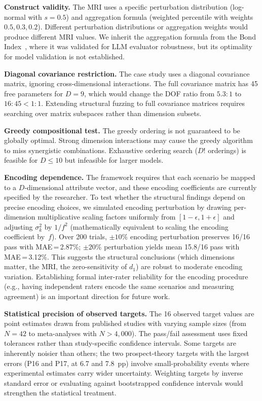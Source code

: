\documentclass[manuscript,review,anonymous]{acmart}
\begin{document}
\textbf{Construct validity.}
The MRI uses a specific perturbation distribution (log-normal with $s = 0.5$) and aggregation formula (weighted percentile with weights $0.5, 0.3, 0.2$).
Different perturbation distributions or aggregation weights would produce different MRI values.
We inherit the aggregation formula from the Bond Index~\cite{bond2026}, where it was validated for LLM evaluator robustness, but its optimality for model validation is not established.

\textbf{Diagonal covariance restriction.}
The case study uses a diagonal covariance matrix, ignoring cross-dimensional interactions.
The full covariance matrix has 45 free parameters for $D = 9$, which would change the DOF ratio from $5.3\!:\!1$ to $16\!:\!45 < 1\!:\!1$.
Extending structural fuzzing to full covariance matrices requires searching over matrix subspaces rather than dimension subsets.

\textbf{Greedy compositional test.}
The greedy ordering is not guaranteed to be globally optimal.
Strong dimension interactions may cause the greedy algorithm to miss synergistic combinations.
Exhaustive ordering search ($D!$ orderings) is feasible for $D \leq 10$ but infeasible for larger models.

\textbf{Encoding dependence.}
The framework requires that each scenario be mapped to a $D$-dimensional attribute vector, and these encoding coefficients are currently specified by the researcher.
To test whether the structural findings depend on precise encoding choices, we simulated encoding perturbation by drawing per-dimension multiplicative scaling factors uniformly from $[1{-}\epsilon, 1{+}\epsilon]$ and adjusting $\sigma_k^2$ by $1/f^2$ (mathematically equivalent to scaling the encoding coefficient by~$f$).
Over 200 trials, $\pm 10\%$ encoding perturbation preserves 16/16 pass with MAE\,=\,2.87\%; $\pm 20\%$ perturbation yields mean 15.8/16 pass with MAE\,=\,3.12\%.
This suggests the structural conclusions (which dimensions matter, the MRI, the zero-sensitivity of $d_1$) are robust to moderate encoding variation.
Establishing formal inter-rater reliability for the encoding procedure (e.g., having independent raters encode the same scenarios and measuring agreement) is an important direction for future work.

\textbf{Statistical precision of observed targets.}
The 16 observed target values are point estimates drawn from published studies with varying sample sizes (from $N = 42$ to meta-analyses with $N > 4{,}000$).
The pass/fail assessment uses fixed tolerances rather than study-specific confidence intervals.
Some targets are inherently noisier than others; the two prospect-theory targets with the largest errors (P16 and P17, at 6.7 and 7.8~pp) involve small-probability events where experimental estimates carry wider uncertainty.
Weighting targets by inverse standard error or evaluating against bootstrapped confidence intervals would strengthen the statistical treatment.
\end{document}
